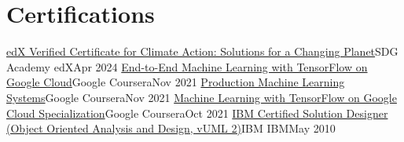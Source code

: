 \section{Certifications}
  \resumeSubHeadingListStart

    \resumeSubheading
      {\href{https://courses.edx.org/certificates/efe2a55656d948db9692c246c33df5e7}{edX Verified Certificate for Climate Action: Solutions for a Changing Planet}}{SDG Academy}
      {edX}{Apr 2024} 
    \resumeSubheading
      {\href{https://www.coursera.org/account/accomplishments/verify/DLHBZAXW55UD}{End-to-End Machine Learning with TensorFlow on Google Cloud}}{Google}
      {Coursera}{Nov 2021} 
    \resumeSubheading
      {\href{https://www.coursera.org/account/accomplishments/verify/A66XLPCJ4N6D}{Production Machine Learning Systems}}{Google}
      {Coursera}{Nov 2021} 
    \resumeSubheading
      {\href{https://www.coursera.org/account/accomplishments/specialization/certificate/JJTMLY8U43XB}{Machine Learning with TensorFlow on Google Cloud Specialization}}{Google}
      {Coursera}{Oct 2021} 
    \resumeSubheading
      {\href{https://drive.google.com/file/d/1xZD_WC_LG5fD0N0FLdJ-ipE5J9z_ZXgH/view?usp=sharing}{IBM Certified Solution Designer (Object Oriented Analysis and Design, vUML 2)}}{IBM}
      {IBM}{May 2010}

  \resumeSubHeadingListEnd